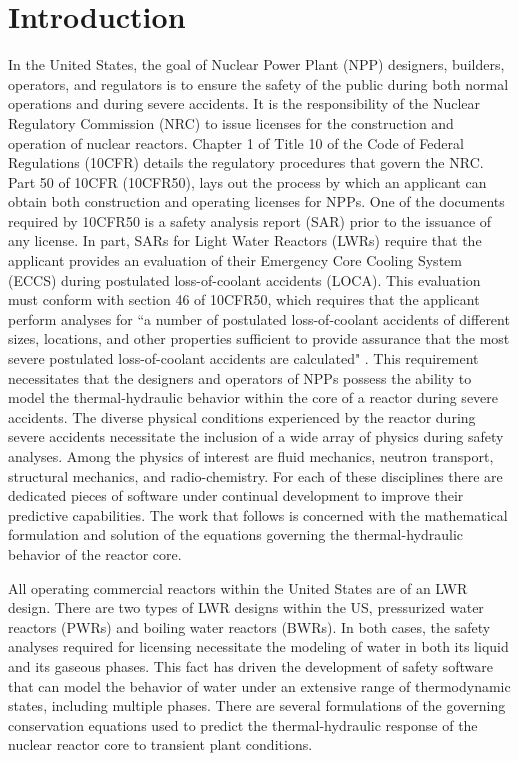 \chapter{Introduction}
\label{chap:intro}
In the United States, the goal of Nuclear Power Plant (NPP) designers, builders, operators, and regulators is to ensure the safety of the public during both normal operations and during severe accidents.
It is the responsibility of the Nuclear Regulatory Commission (NRC) to issue licenses for the construction and operation of nuclear reactors.
Chapter 1 of Title 10 of the Code of Federal Regulations (10CFR) details the regulatory procedures that govern the NRC.
Part 50 of 10CFR (10CFR50), lays out the process by which an applicant can obtain both construction and operating licenses for NPPs.
One of the documents required by 10CFR50 is a safety analysis report (SAR) prior to the issuance of any license.
In part, SARs for Light Water Reactors (LWRs) require that the applicant provides an evaluation of their Emergency Core Cooling System (ECCS) during postulated loss-of-coolant accidents (LOCA).
This evaluation must conform with section 46 of 10CFR50, which requires that the applicant perform analyses for ``a number of postulated loss-of-coolant accidents of different sizes, locations, and other properties sufficient to provide assurance that the most severe postulated loss-of-coolant accidents are calculated" .
This requirement necessitates that the designers and operators of NPPs possess the ability to model the thermal-hydraulic behavior within the core of a reactor during severe accidents.  
The diverse physical conditions experienced by the reactor during severe accidents necessitate the inclusion of a wide array of physics during safety analyses.
Among the physics of interest are fluid mechanics, neutron transport, structural mechanics, and radio-chemistry.
For each of these disciplines there are dedicated pieces of software under continual development to improve their predictive capabilities.
The work that follows is concerned with the mathematical formulation and solution of the equations governing the thermal-hydraulic behavior of the reactor core.

All operating commercial reactors within the United States are of an LWR design.
There are two types of LWR designs within the US, pressurized water reactors (PWRs) and boiling water reactors (BWRs).
In both cases, the safety analyses required for licensing necessitate the modeling of water in both its liquid and its gaseous phases.
This fact has driven the development of safety software that can model the behavior of water under an extensive range of thermodynamic states, including multiple phases.
There are several formulations of the governing conservation equations used to predict the thermal-hydraulic response of the nuclear reactor core to transient plant conditions.

